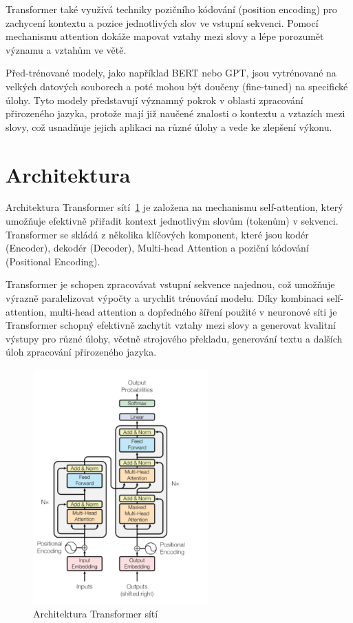 Transformer také využívá techniky pozičního kódování (position encoding) pro zachycení kontextu a pozice jednotlivých slov ve vstupní sekvenci.
Pomocí mechanismu attention dokáže mapovat vztahy mezi slovy a lépe porozumět významu a vztahům ve větě.

Před-trénované modely, jako například BERT nebo GPT, jsou vytrénované na velkých datových souborech a poté mohou být doučeny (fine-tuned) na specifické úlohy.
Tyto modely představují významný pokrok v oblasti zpracování přirozeného jazyka, protože mají již naučené znalosti o kontextu a vztazích mezi slovy, což usnadňuje jejich aplikaci na různé úlohy a vede ke zlepšení výkonu.

\section{Architektura}
Architektura Transformer sítí~\ref{fig:Transformer} je založena na mechanismu self-attention, který umožňuje efektivně přiřadit kontext jednotlivým slovům (tokenům) v sekvenci.
Transformer se skládá z několika klíčových komponent, které jsou kodér (Encoder), dekodér (Decoder), Multi-head Attention a poziční kódování (Positional Encoding).

Transformer je schopen zpracovávat vstupní sekvence najednou, což umožňuje výrazně paralelizovat výpočty a urychlit trénování modelu.
Díky kombinaci self-attention, multi-head attention a dopředného šíření použité v neuronové síti je Transformer schopný efektivně zachytit vztahy mezi slovy a generovat kvalitní výstupy pro různé úlohy, včetně strojového překladu, generování textu a dalších úloh zpracování přirozeného jazyka.

\begin{figure}[H]
	\centering
	\includegraphics[width=0.6\textwidth]{Figures/transformer_enco_deco.png}
	\caption{Architektura Transformer sítí~\cite{link25}}\label{fig:Transformer}
\end{figure}

